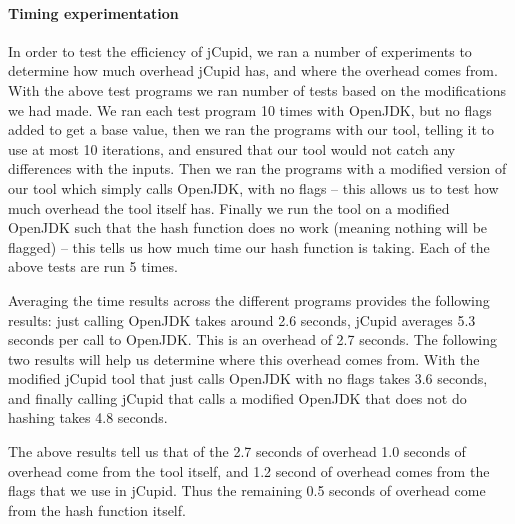 \paragraph{Timing experimentation}
In order to test the efficiency of jCupid, we ran a number of experiments to
determine how much overhead jCupid has, and where the overhead comes from.
With the above test programs we ran number of tests based on the modifications
we had made. We ran each test program 10 times with OpenJDK, but no flags added
to get a base value, then we ran the programs with our tool, telling it to use
at most 10 iterations, and ensured that our tool would not catch any differences
with the inputs. Then we ran the programs with a modified version of our tool 
which simply calls OpenJDK, with no flags -- this allows us to test how much 
overhead the tool itself has. Finally we run the tool on a modified OpenJDK such
that the hash function does no work (meaning nothing will be flagged) -- this 
tells us how much time our hash function is taking. Each of the above tests are 
run 5 times.

Averaging the time results across the different programs provides the following
results: just calling OpenJDK takes around 2.6 seconds, jCupid averages 5.3 seconds
per call to OpenJDK. This is an overhead of 2.7 seconds. The following two results
will help us determine where this overhead comes from. With the modified jCupid tool
that just calls OpenJDK with no flags takes 3.6 seconds, and finally calling jCupid
that calls a modified OpenJDK that does not do hashing takes 4.8 seconds.

The above results tell us that of the 2.7 seconds of overhead 1.0 seconds of overhead
come from the tool itself, and 1.2 second of overhead comes from the flags that
we use in jCupid. Thus the remaining 0.5 seconds of overhead come from the hash
function itself.
